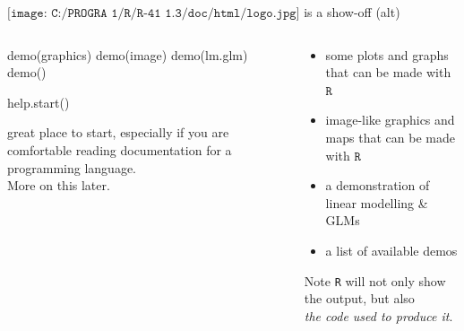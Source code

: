 \documentclass[
  ignorenonframetext,
]{beamer}
\newenvironment{Shaded}{\begin{snugshade}}{\end{snugshade}}
\newcommand{\FunctionTok}[1]{\textcolor[rgb]{0.00,0.00,0.00}{#1}}
\newcommand{\NormalTok}[1]{#1}
\begin{document}
\begin{frame}[fragile]{\(\texttt{[image: C:/PROGRA~1/R/R-41~1.3/doc/html/logo.jpg]}\)
is a show-off (alt)}
\protect\hypertarget{includegraphicsheight1emcprogra1rr-411.3dochtmllogo.jpg-is-a-show-off-alt}{}
\begin{columns}[T]
\begin{column}{0.4\textwidth}
\begin{Shaded}
\begin{Highlighting}[]
\FunctionTok{demo}\NormalTok{(graphics)  }
\FunctionTok{demo}\NormalTok{(image)     }
\FunctionTok{demo}\NormalTok{(lm.glm)    }
\FunctionTok{demo}\NormalTok{()          }

\FunctionTok{help.start}\NormalTok{()    }
\end{Highlighting}
\end{Shaded}

\hfill\break
{} great place to start, especially if you are
comfortable reading documentation for a programming language.\\
More on this later.
\end{column}

\begin{column}{0.6\textwidth}
\begin{itemize}

\item[\tikzmarknode{b1}{$\bullet$}]
  some plots and graphs that can be made with $\texttt{R}$

\item[\tikzmarknode{b2}{$\bullet$}]
  image-like graphics and maps that can be made with $\texttt{R}$

\item[\tikzmarknode{b3}{$\bullet$}]
  a demonstration of linear modelling \& GLMs

\item[\tikzmarknode{b4}{$\bullet$}]
  a list of available demos

\end{itemize}

\hfill\break

\begin{block}{Note}
\protect\hypertarget{note-1}{}
\texttt{R}{} will not only show the output, but also\\
\emph{the code used to produce it}.
\end{block}
\end{column}
\end{columns}

\end{frame}
\end{document}
